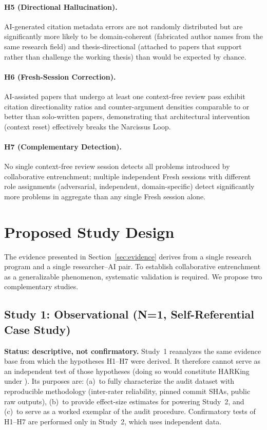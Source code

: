 \documentclass[12pt]{article}
\begin{document}
\paragraph{H5 (Directional Hallucination).} AI-generated citation metadata errors are not randomly distributed but are significantly more likely to be domain-coherent (fabricated author names from the same research field) and thesis-directional (attached to papers that support rather than challenge the working thesis) than would be expected by chance.

\paragraph{H6 (Fresh-Session Correction).} AI-assisted papers that undergo at least one context-free review pass exhibit citation directionality ratios and counter-argument densities comparable to or better than solo-written papers, demonstrating that architectural intervention (context reset) effectively breaks the Narcissus Loop.

\paragraph{H7 (Complementary Detection).} No single context-free review session detects all problems introduced by collaborative entrenchment; multiple independent Fresh sessions with different role assignments (adversarial, independent, domain-specific) detect significantly more problems in aggregate than any single Fresh session alone.

\section{Proposed Study Design}
\label{sec:study-design}

The evidence presented in Section~\ref{sec:evidence} derives from a single research program and a single researcher--AI pair. To establish collaborative entrenchment as a generalizable phenomenon, systematic validation is required. We propose two complementary studies.

\subsection{Study 1: Observational (N=1, Self-Referential Case Study)}
\label{sec:study1}

\textbf{Status: descriptive, not confirmatory.} Study~1 reanalyzes the same evidence base from which the hypotheses H1--H7 were derived. It therefore cannot serve as an independent test of those hypotheses (doing so would constitute HARKing under \citealp{kerr1998}). Its purposes are: (a)~to fully characterize the audit dataset with reproducible methodology (inter-rater reliability, pinned commit SHAs, public raw outputs), (b)~to provide effect-size estimates for powering Study~2, and (c)~to serve as a worked exemplar of the audit procedure. Confirmatory tests of H1--H7 are performed only in Study~2, which uses independent data.
\end{document}
